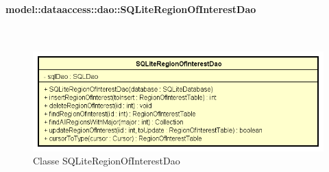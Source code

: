 \documentclass[../DefinizioneDiProdotto.tex]{subfiles}
\begin{document}
\paragraph{model::dataaccess::dao::SQLiteRegionOfInterestDao}
\
\begin{figure}[H]
	\centering
	\includegraphics[width=\maxwidth]{img/SQLiteRegionOfInterestDao.png}
	\caption{Classe SQLiteRegionOfInterestDao}\label{fig:model::dataaccess::dao::SQLiteRegionOfInterestDao} 
\end{figure}
\end{document}
